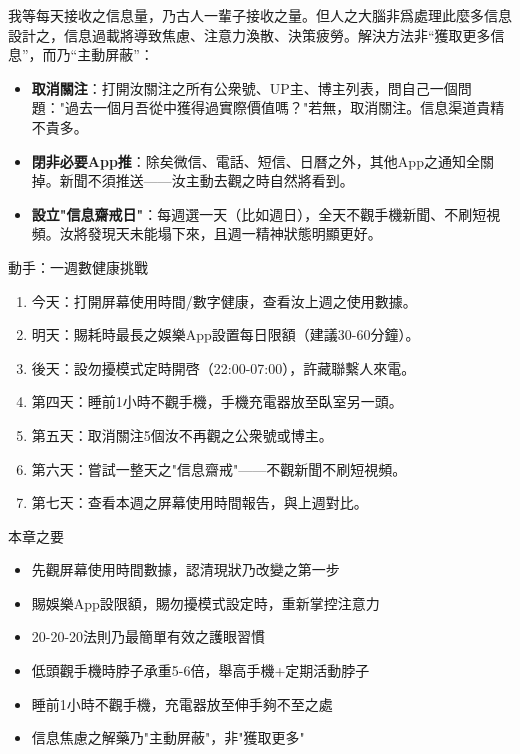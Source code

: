 
我等每天接收之信息量，乃古人一輩子接收之量。但人之大腦非爲處理此麼多信息設計之，信息過載將導致焦慮、注意力渙散、決策疲勞。解決方法非“獲取更多信息”，而乃“主動屏蔽”：

\begin{itemize}
  \item \textbf{取消關注}：打開汝關注之所有公衆號、UP主、博主列表，問自己一個問題："過去一個月吾從中獲得過實際價值嗎？"若無，取消關注。信息渠道貴精不貴多。
  \item \textbf{閉非必要App推}：除矣微信、電話、短信、日曆之外，其他App之通知全關掉。新聞不須推送——汝主動去觀之時自然將看到。
  \item \textbf{設立"信息齋戒日"}：每週選一天（比如週日），全天不觀手機新聞、不刷短視頻。汝將發現天未能塌下來，且週一精神狀態明顯更好。
\end{itemize}

\begin{tcbpractice}{動手：一週數健康挑戰}
\begin{enumerate}
  \item 今天：打開屏幕使用時間/數字健康，查看汝上週之使用數據。
  \item 明天：賜耗時最長之娛樂App設置每日限額（建議30-60分鐘）。
  \item 後天：設勿擾模式定時開啓（22:00-07:00），許藏聯繫人來電。
  \item 第四天：睡前1小時不觀手機，手機充電器放至臥室另一頭。
  \item 第五天：取消關注5個汝不再觀之公衆號或博主。
  \item 第六天：嘗試一整天之"信息齋戒"——不觀新聞不刷短視頻。
  \item 第七天：查看本週之屏幕使用時間報告，與上週對比。
\end{enumerate}

\end{tcbpractice}

\begin{tcbsummary}{本章之要}
\begin{itemize}
  \item 先觀屏幕使用時間數據，認清現狀乃改變之第一步
  \item 賜娛樂App設限額，賜勿擾模式設定時，重新掌控注意力
  \item 20-20-20法則乃最簡單有效之護眼習慣
  \item 低頭觀手機時脖子承重5-6倍，舉高手機+定期活動脖子
  \item 睡前1小時不觀手機，充電器放至伸手夠不至之處
  \item 信息焦慮之解藥乃"主動屏蔽"，非"獲取更多"
\end{itemize}

\end{tcbsummary}
